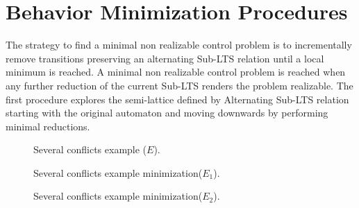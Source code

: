 \section{Behavior Minimization Procedures}\label{sect:solution}

The strategy to find a minimal non realizable control problem is to incrementally remove transitions preserving an alternating Sub-LTS relation until a local minimum is reached.  A minimal non realizable control problem is reached when any further reduction of the current Sub-LTS renders the problem realizable.
The first procedure explores the semi-lattice defined by Alternating Sub-LTS relation starting with the original automaton and moving downwards by performing minimal reductions. 
  
\begin{figure}[bt]
\centering
\SmallPicture
{}
\caption{Several conflicts example ($E$).}
\label{fig:fig.several-conflicts}
\MediumPicture
\end{figure}

\begin{figure}[bt]
\centering
\SmallPicture
{}
\caption{Several conflicts example minimization($E_1$).}
\label{fig:fig.several-conflicts-min1}
\MediumPicture
\end{figure}

\begin{figure}[bt]
\centering
\SmallPicture
{}
\caption{Several conflicts example minimization($E_2$).}
\label{fig:fig.several-conflicts-min2}
\MediumPicture
\end{figure}


